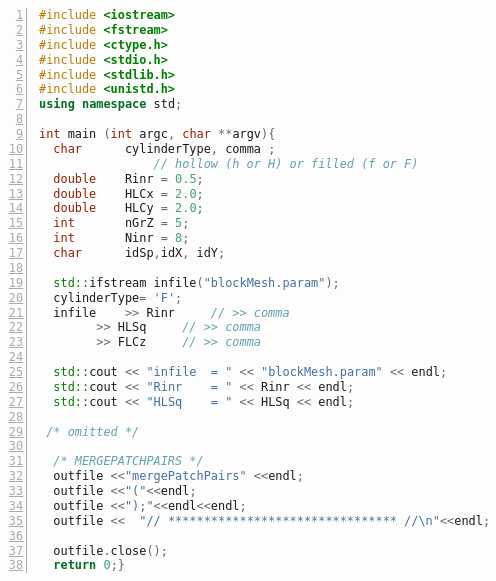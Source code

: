 \begin{lstlisting}[language=C++,numbers=left,basicstyle={\ttfamily},breaklines=true,showspaces=false]
#include <iostream>
#include <fstream>
#include <ctype.h>
#include <stdio.h>
#include <stdlib.h>
#include <unistd.h>
using namespace std;

int main (int argc, char **argv){
  char		cylinderType, comma ; 
                // hollow (h or H) or filled (f or F)
  double	Rinr = 0.5; 
  double	HLCx = 2.0;
  double	HLCy = 2.0;
  int		nGrZ = 5;
  int		Ninr = 8;
  char		idSp,idX, idY;

  std::ifstream infile("blockMesh.param");
  cylinderType= 'F';
  infile    >> Rinr		// >> comma
	    >> HLSq		// >> comma
	    >> FLCz		// >> comma

  std::cout << "infile  = " << "blockMesh.param" << endl;
  std::cout << "Rinr    = " << Rinr << endl;
  std::cout << "HLSq    = " << HLSq << endl;      
 
 /* omitted */  
  
  /* MERGEPATCHPAIRS */
  outfile <<"mergePatchPairs" <<endl;
  outfile <<"("<<endl;
  outfile <<");"<<endl<<endl;
  outfile <<  "// ******************************** //\n"<<endl;

  outfile.close();
  return 0;}
\end{lstlisting}
